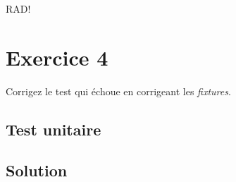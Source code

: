 RAD!

\hypertarget{exercice-4}{%
\section{Exercice 4}\label{exercice-4}}

Corrigez le test qui échoue en corrigeant les \emph{fixtures}.

\begin{otherlanguage}{english}

\begin{Shaded}
\begin{Highlighting}[]
\NormalTok{$ }

\NormalTok{$ }
\NormalTok{$ }
\NormalTok{$ }
\NormalTok{$ }

\NormalTok{$ }
\end{Highlighting}
\end{Shaded}

\end{otherlanguage}

\hypertarget{test-unitaire}{%
\subsection{Test unitaire}\label{test-unitaire}}

\begin{otherlanguage}{english}

\begin{Shaded}
\begin{Highlighting}[]

 \NormalTok{ < }\NormalTok{::}
 
\NormalTok{)}
\end{Highlighting}
\end{Shaded}

\end{otherlanguage}

\hypertarget{solution}{%
\subsection{Solution}\label{solution}}

